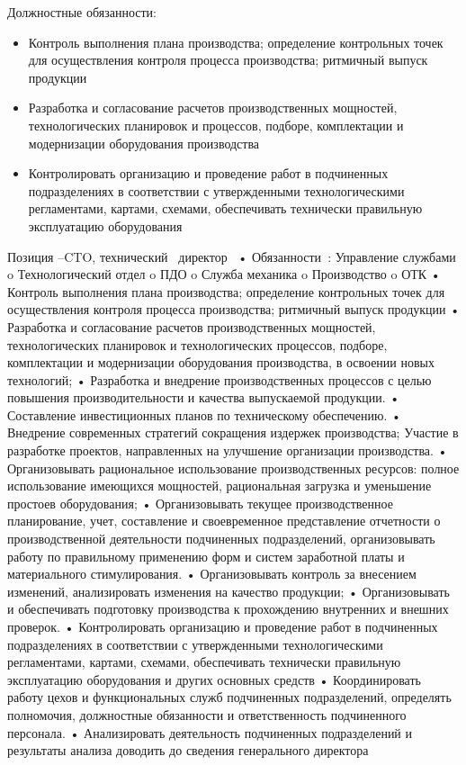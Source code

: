\documentclass{../industrial-development}
\begin{document}
{\begin{frame}
\begin{block}{}
Должностные обязанности: 
  \end{block}
  \begin{itemize}
  \item Контроль выполнения плана производства; определение контрольных точек для осуществления контроля процесса производства; ритмичный выпуск продукции
 \item Разработка и согласование расчетов производственных мощностей, технологических планировок и  процессов, подборе, комплектации и модернизации оборудования производства
 \item Контролировать организацию и проведение работ в подчиненных подразделениях в соответствии с утвержденными технологическими регламентами, картами, схемами, обеспечивать технически правильную эксплуатацию оборудования 
  \end{itemize}
\end{frame}

\lecturenotes
Позиция –CTO, технический~\cite{hh} директор~\cite{itcf}
•	Обязанности~\cite{rab}:
Управление службами
o	Технологический отдел
o	ПДО
o	Служба механика
o	Производство
o	ОТК
•	Контроль выполнения плана производства; определение контрольных точек для осуществления контроля процесса производства; ритмичный выпуск продукции
•	Разработка и согласование расчетов производственных мощностей, технологических планировок и технологических процессов, подборе, комплектации и модернизации оборудования производства, в освоении новых технологий;
•	Разработка и внедрение производственных процессов с целью повышения производительности и качества выпускаемой продукции.
•	Составление инвестиционных планов по техническому обеспечению.
•	Внедрение современных стратегий сокращения издержек производства; Участие в разработке проектов, направленных на улучшение организации производства.
•	Организовывать рациональное использование производственных ресурсов: полное использование имеющихся мощностей, рациональная загрузка и уменьшение простоев оборудования;
•	Организовывать текущее производственное планирование, учет, составление и своевременное представление отчетности о производственной деятельности подчиненных подразделений, организовывать работу по правильному применению форм и систем заработной платы и материального стимулирования.
•	Организовывать контроль за внесением изменений, анализировать изменения на качество продукции;
•	Организовывать и обеспечивать подготовку производства к прохождению внутренних и внешних проверок.
•	Контролировать организацию и проведение работ в подчиненных подразделениях в соответствии с утвержденными технологическими регламентами, картами, схемами, обеспечивать технически правильную эксплуатацию оборудования и других основных средств
•	Координировать работу цехов и функциональных служб подчиненных подразделений, определять полномочия, должностные обязанности и ответственность подчиненного персонала.
•	Анализировать деятельность подчиненных подразделений и результаты анализа доводить до сведения генерального директора


}
\end{document}
